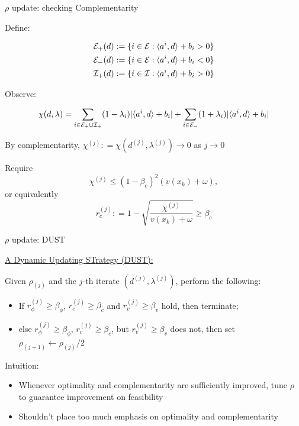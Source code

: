 \documentclass[8pt]{beamer}
\begin{document}
\begin{frame}{$\rho$ update: checking Complementarity}

Define: 

\[ \begin{aligned}
{\cal E}_+(d) & := \{  i\in {\cal E}:  \langle a^i, d\rangle + b_i > 0\}\\
{\cal E}_-(d) & := \{ i\in{\cal E}:  \langle a^i, d\rangle + b_i < 0\} \\
{\cal I}_+(d) & := \{i \in{\cal I}: \langle a^i, d\rangle + b_i > 0\}
\end{aligned}
\]

Observe: 

\[ \chi(d,\lambda) = \sum_{i\in {\cal E}_+\cup {\cal I}_+} (1-\lambda_i) |\langle a^i, d\rangle + b_i| + \sum_{i\in{\cal E}_-} (1+\lambda_i) |\langle a^i, d\rangle + b_i|  \]

By complementarity,    {\blue $\chi^{(j)}: =  \chi(d^{(j)},\lambda^{(j)}) \to 0$  as $j\to 0$ }
 
 \vfill
 
 
 Require \[ \chi^{(j)} \le (1-\beta_c)^2 (v(x_k)+\omega), \]
 or equivalently
 {\red \[ r_c^{(j)}: =1- \sqrt{  \frac{ \chi^{(j)} }{v(x_k)+\omega} } \ge \beta_c \]}
 
\end{frame}




 




\begin{frame}{$\rho$ update:  DUST} 


\underline{ A {\blue D}ynamic {\blue U}pdating {\blue ST}rategy (DUST):} 

\vfill 



Given $\rho_{(j)}$ and the $j$-th iterate $(d^{(j)}, \lambda^{(j)})$, perform the following:

\begin{itemize}
\item  If $r_{\phi}^{(j)} \ge \beta_\phi$, $r_c^{(j)} \ge \beta_c$ and $r_v^{(j)} \ge \beta_v$ hold, then terminate; 
\item  else $r_{\phi}^{(j)} \ge \beta_\phi$, $r_c^{(j)} \ge \beta_c$, but $r_v^{(j)} \ge \beta_v$ does not, then set $\rho_{(j+1)} \gets \rho_{(j)}/2$
\end{itemize}
  
  \vfill
 
 
  {\blue 
\leftpointright Intuition:}  

 \begin{itemize}
 \item Whenever optimality and complementarity are sufficiently improved,  tune  $\rho$ to guarantee improvement on feasibility 
 \item Shouldn't place too much emphasis on optimality and complementarity
 \end{itemize}
 
\end{frame}
\end{document}
